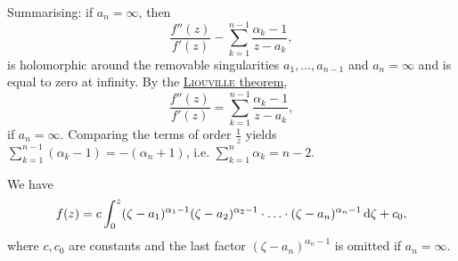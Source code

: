 \documentclass[a4paper,english]{article}
\begin{document}
\begin{pr}
    Summarising: if $a_n = \infty$, then
    \begin{equation*}
        \frac{f''(z)}{f'(z)} - \sum_{k = 1}^{n - 1} \frac{\alpha_k - 1}{z - a_k},
    \end{equation*}
    is holomorphic around the removable singularities $a_1, \ldots, a_{n - 1}$ and $a_n = \infty$ and is equal to zero at infinity.
    By the \hyperref[th:Liouville]{\textsc{Liouville} theorem}, 
    \begin{equation*}
        \frac{f''(z)}{f'(z)}
        = \sum_{k = 1}^{n - 1} \frac{\alpha_k - 1}{z - a_k},
    \end{equation*}
    if $a_n = \infty$.
    Comparing the terms of order $\frac{1}{z}$ yields $\sum_{k = 1}^{n - 1} (\alpha_k - 1) = - (\alpha_n + 1)$, i.e. $\sum_{k = 1}^{n} \alpha_k = n - 2$.
\end{pr}

\begin{cor}
    We have
    \begin{equation*}
        f(z)
        = c \int_{0}^{z} (\zeta - a_1)^{\alpha_1 - 1} (\zeta - a_2)^{\alpha_2 - 1} \cdot \ldots \cdot (\zeta - a_n)^{\alpha_n - 1} \mathop{}\!\mathrm{d}{\zeta} + c_0,
    \end{equation*}
    where $c, c_0$ are constants and the last factor $ (\zeta - a_n)^{\alpha_n - 1}$ is omitted if $a_n = \infty$.
\end{cor}
\end{document}
